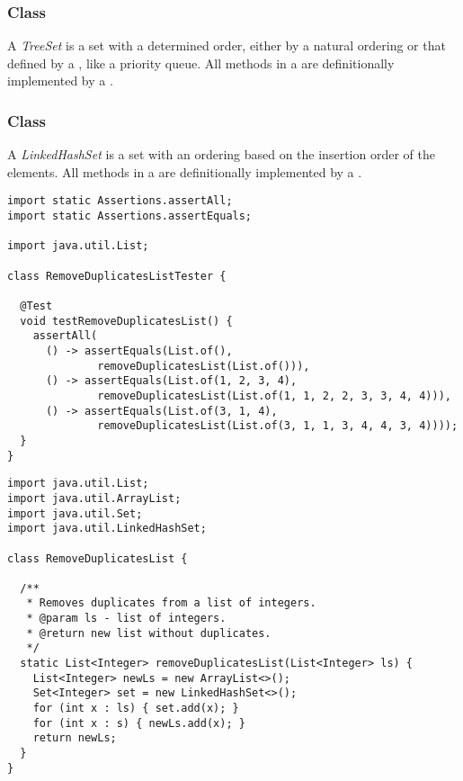 \subsubsection*{ Class}
A \emph{TreeSet} is a set with a determined order, either by a natural ordering or that defined by a , like a priority queue. All methods in a  are definitionally implemented by a .

\subsubsection*{ Class}
A \emph{LinkedHashSet} is a set with an ordering based on the insertion order of the elements. All methods in a  are definitionally implemented by a .


\begin{lstlisting}[language=MyJava]
import static Assertions.assertAll;
import static Assertions.assertEquals;

import java.util.List;

class RemoveDuplicatesListTester {

  @Test
  void testRemoveDuplicatesList() {
    assertAll(
      () -> assertEquals(List.of(), 
              removeDuplicatesList(List.of())),
      () -> assertEquals(List.of(1, 2, 3, 4), 
              removeDuplicatesList(List.of(1, 1, 2, 2, 3, 3, 4, 4))),
      () -> assertEquals(List.of(3, 1, 4), 
              removeDuplicatesList(List.of(3, 1, 1, 3, 4, 4, 3, 4))));
  }
}
\end{lstlisting}

\begin{lstlisting}[language=MyJava]
import java.util.List;
import java.util.ArrayList;
import java.util.Set;
import java.util.LinkedHashSet;

class RemoveDuplicatesList {

  /**
   * Removes duplicates from a list of integers.
   * @param ls - list of integers.
   * @return new list without duplicates.
   */
  static List<Integer> removeDuplicatesList(List<Integer> ls) {
    List<Integer> newLs = new ArrayList<>();
    Set<Integer> set = new LinkedHashSet<>();
    for (int x : ls) { set.add(x); }
    for (int x : s) { newLs.add(x); }
    return newLs;
  }
}
\end{lstlisting}

